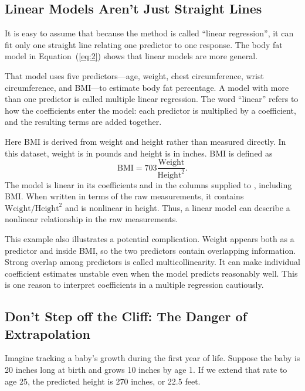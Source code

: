 \subsection{Linear Models Aren't Just Straight Lines}
\label{sec:linear_not_straight}

It is easy to assume that because the method is called ``linear regression'',
it can fit only one straight line relating one predictor to one response. The
body fat model in Equation~(\ref{eq:2}) shows that linear models are more
general.

That model uses five predictors---age, weight, chest circumference, wrist
circumference, and BMI---to estimate body fat percentage. A model with more
than one predictor is called multiple linear
regression. The word ``linear'' refers to how
the coefficients enter the model: each predictor is multiplied by a
coefficient, and the resulting terms are added together.

Here BMI is derived from weight and height rather than measured directly. In
this dataset, weight is in pounds and height is in inches. BMI is defined as
\begin{equation*}
  \text{BMI} = 703\frac{\text{Weight}}{\text{Height}^2}.
\end{equation*}
The model is linear in its coefficients and in the columns supplied to
, including BMI. When written in terms of the raw measurements, it
contains $\text{Weight}/\text{Height}^2$ and is nonlinear in height. Thus, a
linear model can describe a nonlinear relationship
in the raw measurements.

This example also illustrates a potential complication. Weight appears both as
a predictor and inside BMI, so the two predictors contain overlapping
information. Strong overlap among predictors is called
multicollinearity. It can make individual coefficient
estimates unstable even when the model predicts reasonably well. This is one
reason to interpret coefficients in a multiple regression cautiously.

\subsection{Don't Step off the Cliff: The Danger of Extrapolation}
\label{sec:extrapolation}

Imagine tracking a baby's growth during the first year of life. Suppose the baby
is 20 inches long at birth and grows 10 inches by age 1. If we extend that rate
to age 25, the predicted height is 270 inches, or 22.5 feet.

